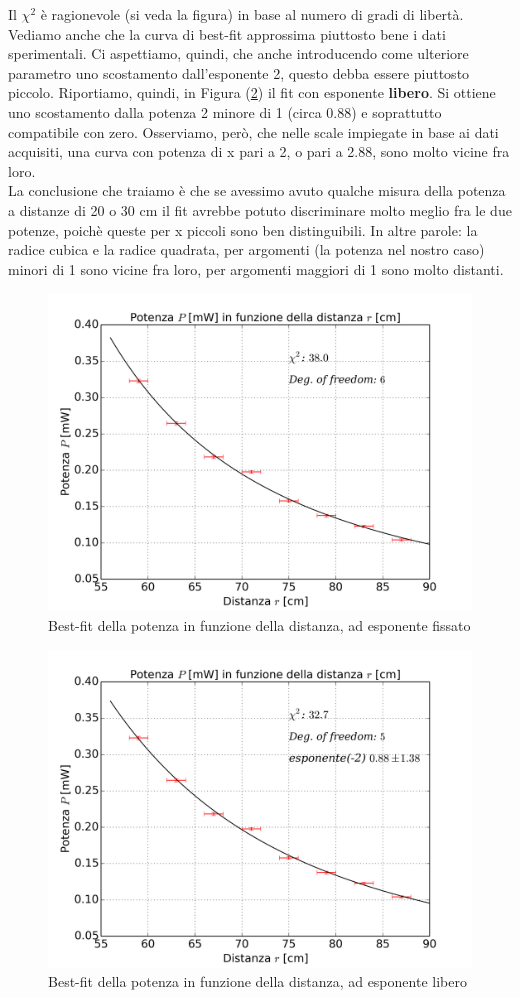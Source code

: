 \documentclass[journal, a4paper]{IEEEtran}
\begin{document}
Il $\chi^2$ è ragionevole (si veda la figura) in base al numero di gradi di libertà. Vediamo anche che la curva di best-fit approssima piuttosto bene i dati sperimentali. Ci aspettiamo, quindi, che anche introducendo come ulteriore parametro uno scostamento dall'esponente 2, questo debba essere piuttosto piccolo. Riportiamo, quindi, in Figura (\ref{fig:es7_fit_devexp}) il fit con esponente \textbf{libero}. Si ottiene uno scostamento dalla potenza 2 minore di 1 (circa 0.88) e soprattutto compatibile con zero. Osserviamo, però, che nelle scale impiegate in base ai dati acquisiti, una curva con potenza di x pari a 2, o pari a 2.88, sono molto vicine fra loro. \\
La conclusione che traiamo è che se avessimo avuto qualche misura della potenza a distanze di 20 o 30 cm il fit avrebbe potuto discriminare molto meglio fra le due potenze, poichè queste per x piccoli sono ben distinguibili. In altre parole: la radice cubica e la radice quadrata, per argomenti (la potenza nel nostro caso) minori di 1 sono vicine fra loro, per argomenti maggiori di 1 sono molto distanti.

\begin{figure}
\centering
\includegraphics[width=0.8\linewidth]{./es7_fit_fissexp}
\caption{Best-fit della potenza in funzione della distanza, ad esponente fissato}
\label{fig:es7_fit_fissexp}
\end{figure}

\begin{figure}
\centering
\includegraphics[width=0.8\linewidth]{./es7_fit_devexp}
\caption{Best-fit della potenza in funzione della distanza, ad esponente libero}
\label{fig:es7_fit_devexp}
\end{figure}
\end{document}
